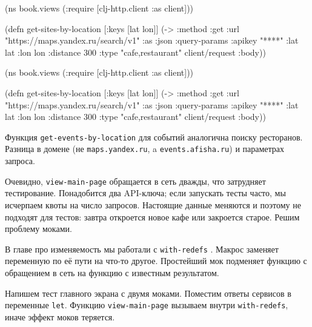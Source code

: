 
\ifnarrow

\begin{english}
  \begin{clojure}
(ns book.views
  (:require
   [clj-http.client :as client]))

(defn get-sites-by-location
  [{:keys [lat lon]}]
  (-> {:method :get
       :url
       "https://maps.yandex.ru/search/v1"
       :as :json
       :query-params
       {:apikey "****"
        :lat lat :lon lon :distance 300
        :type "cafe,restaurant"}}
      client/request
      :body))
  \end{clojure}
\end{english}

\else

\begin{english}
  \begin{clojure}
(ns book.views
  (:require [clj-http.client :as client]))

(defn get-sites-by-location
  [{:keys [lat lon]}]
  (-> {:method :get
       :url "https://maps.yandex.ru/search/v1"
       :as :json
       :query-params {:apikey "****"
                      :lat lat
                      :lon lon
                      :distance 300
                      :type "cafe,restaurant"}}
      client/request
      :body))
  \end{clojure}
\end{english}

\fi

Функция \verb|get-events-by-location| для событий аналогична поиску
ресторанов. Разница в домене (не \verb|maps.yandex.ru|, a
\verb|events.afisha.ru|) и параметрах запроса.

Очевидно, \verb|view-main-page| обращается в сеть дважды, что затрудняет
тестирование. Понадобится два API-ключа; если запускать тесты часто, мы
исчерпаем квоты на число запросов. Настоящие данные меняются и поэтому не
подходят для тестов: завтра откроется новое кафе или закроется старое. Решим
проблему моками.


В главе про изменяемость мы работали с \verb|with-redefs| .
Макрос заменяет переменную по её пути на что-то другое. Простейший мок подменяет
функцию с обращением в сеть на функцию с известным результатом.

Напишем тест главного экрана с двумя моками. Поместим ответы сервисов в
переменные \verb|let|. Функцию \verb|view-main-page| вызываем внутри
\verb|with-redefs|, иначе эффект моков теряется.

